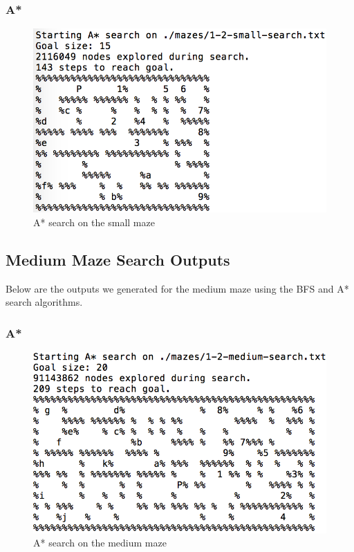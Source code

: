 \documentclass[titlepage]{article}
\begin{document}
\newpage

\subsubsection*{A*}
\begin{figure}[h!]
\includegraphics[width=\linewidth]{astarsmall1-2.png}
\caption{A* search on the small maze}
\label{fig:astarsmall}
\end{figure}

\newpage

\subsection*{Medium Maze Search Outputs}
Below are the outputs we generated for the medium maze using the BFS and A* search algorithms. 


%

\subsubsection*{A*}
\begin{figure}[h!]
\includegraphics[width=\linewidth]{astarmedium1-2.png}
\caption{A* search on the medium maze}
\label{fig:astarmedium}
\end{figure}
\end{document}

